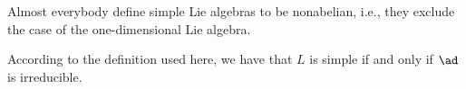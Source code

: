 Almost everybody define simple Lie algebras to be nonabelian, i.e.,
they exclude the case of the one-dimensional Lie algebra.

According to the definition used here, we have that $L$ is simple if and only
if $\ad$ is irreducible.

